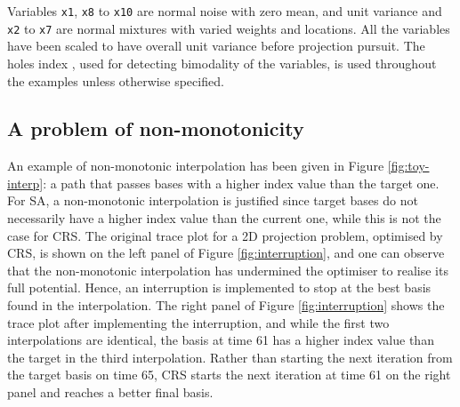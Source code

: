 \noindent Variables \texttt{x1}, \texttt{x8} to \texttt{x10} are normal
noise with zero mean, and unit variance and \texttt{x2} to \texttt{x7}
are normal mixtures with varied weights and locations. All the variables
have been scaled to have overall unit variance before projection
pursuit. The holes index \citep{cook2008grand}, used for detecting
bimodality of the variables, is used throughout the examples unless
otherwise specified.

\hypertarget{monotonic}{%
\subsection{A problem of non-monotonicity}\label{monotonic}}

An example of non-monotonic interpolation has been given in Figure
\ref{fig:toy-interp}: a path that passes bases with a higher index value
than the target one. For SA, a non-monotonic interpolation is justified
since target bases do not necessarily have a higher index value than the
current one, while this is not the case for CRS. The original trace plot
for a 2D projection problem, optimised by CRS, is shown on the left
panel of Figure \ref{fig:interruption}, and one can observe that the
non-monotonic interpolation has undermined the optimiser to realise its
full potential. Hence, an interruption is implemented to stop at the
best basis found in the interpolation. The right panel of Figure
\ref{fig:interruption} shows the trace plot after implementing the
interruption, and while the first two interpolations are identical, the
basis at time 61 has a higher index value than the target in the third
interpolation. Rather than starting the next iteration from the target
basis on time 65, CRS starts the next iteration at time 61 on the right
panel and reaches a better final basis.

